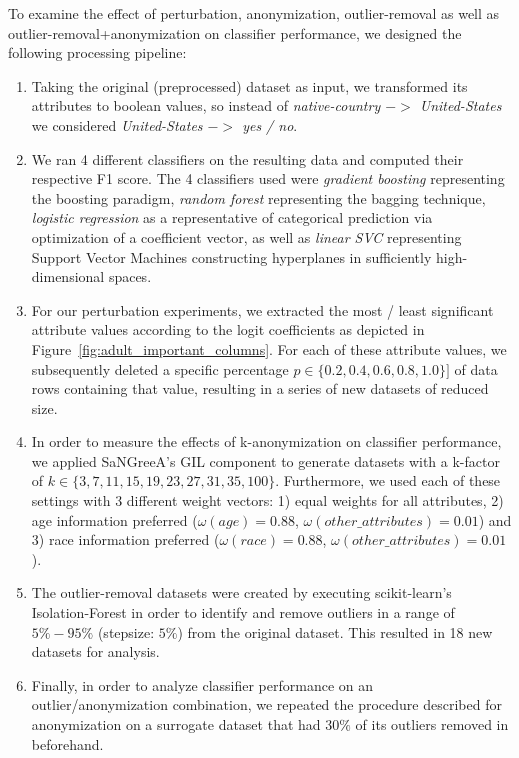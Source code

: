 \documentclass{llncs}
\begin{document}
To examine the effect of perturbation, anonymization, outlier-removal as well as outlier-removal+anonymization on classifier performance, we designed the following processing pipeline:


\begin{enumerate}
	\item Taking the original (preprocessed) dataset as input, we transformed its attributes to boolean values, so instead of \textit{native-country $->$ United-States} we considered \textit{United-States $->$ yes / no}.
	\item We ran 4 different classifiers on the resulting data and computed their respective F1 score. The 4 classifiers used were \textit{gradient boosting} representing the boosting paradigm, \textit{random forest} representing the bagging technique, \textit{logistic regression} as a representative of categorical prediction via optimization of a coefficient vector, as well as \textit{linear SVC} representing Support Vector Machines constructing hyperplanes in sufficiently high-dimensional spaces.
	\item For our perturbation experiments, we extracted the most / least significant attribute values according to the logit coefficients as depicted in Figure~\ref{fig:adult_important_columns}. For each of these attribute values, we subsequently deleted a specific percentage $p \in \{0.2, 0.4, 0.6, 0.8, 1.0 \}]$ of data rows containing that value, resulting in a series of new datasets of reduced size.
	\item In order to measure the effects of k-anonymization on classifier performance, we applied SaNGreeA's GIL component to generate datasets with a k-factor of $k \in \{3, 7, 11, 15, 19, 23, 27, 31, 35, 100\}$. Furthermore, we used each of these settings with 3 different weight vectors: 1) equal weights for all attributes, 2) age information preferred ($\omega(age)=0.88$, $\omega(other\_attributes)=0.01$) and 3) race information preferred ($\omega(race)=0.88$, $\omega(other\_attributes)=0.01$).
	\item The outlier-removal datasets were created by executing scikit-learn's Isolation-Forest in order to identify and remove outliers in a range of $5\% - 95\%$ (stepsize: $5\%$) from the original dataset. This resulted in 18 new datasets for analysis.
	\item Finally, in order to analyze classifier performance on an outlier/anonymization combination, we repeated the procedure described for anonymization on a surrogate dataset that had $30\%$ of its outliers removed in beforehand.
\end{enumerate}
\end{document}
